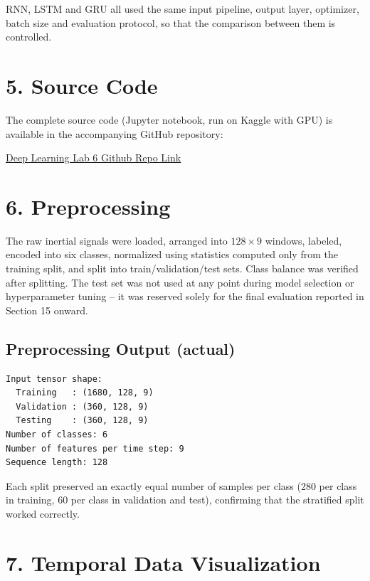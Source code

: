 \documentclass[10pt]{article}
\begin{document}
RNN, LSTM and GRU all used the same input pipeline, output layer, optimizer,
batch size and evaluation protocol, so that the comparison between them is
controlled.

\section*{5. Source Code}

The complete source code (Jupyter notebook, run on Kaggle with GPU) is
available in the accompanying GitHub repository:

\href{https://github.com/Ankith-Davey/Deep-Learning-Lab-Ankith-24011101004/tree/main/Lab%206} {Deep Learning Lab 6 Github Repo Link}

\section*{6. Preprocessing}

The raw inertial signals were loaded, arranged into $128\times9$ windows,
labeled, encoded into six classes, normalized using statistics computed only
from the training split, and split into train/validation/test sets. Class
balance was verified after splitting. The test set was not used at any
point during model selection or hyperparameter tuning -- it was reserved
solely for the final evaluation reported in Section 15 onward.

\subsection*{Preprocessing Output (actual)}

\begin{verbatim}
Input tensor shape:
  Training   : (1680, 128, 9)
  Validation : (360, 128, 9)
  Testing    : (360, 128, 9)
Number of classes: 6
Number of features per time step: 9
Sequence length: 128
\end{verbatim}

Each split preserved an exactly equal number of samples per class (280 per
class in training, 60 per class in validation and test), confirming that the
stratified split worked correctly.

\section*{7. Temporal Data Visualization}
\end{document}
